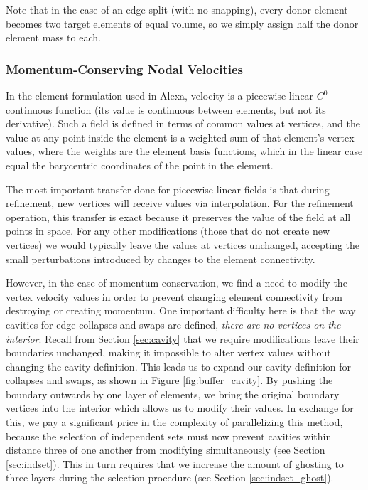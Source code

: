 Note that in the case of an edge split (with no snapping),
every donor element becomes two target elements of equal volume, so we simply
assign half the donor element mass to each.

\subsubsection{Momentum-Conserving Nodal Velocities}
\label{sec:conserve_momentum}

In the element formulation used in Alexa, velocity is
a piecewise linear $C^0$ continuous function
(its value is continuous between elements, but not its derivative).
Such a field is defined in terms of common values at vertices,
and the value at any point inside the element is a weighted sum
of that element's vertex values,
where the weights are the element basis functions, which
in the linear case equal the barycentric coordinates of the point
in the element.

The most important transfer done for piecewise linear fields is that during
refinement, new vertices will receive values via interpolation.
For the refinement operation, this transfer is exact because
it preserves the value of the field at all points in space.
For any other modifications (those that do not create
new vertices) we would typically leave the values at vertices unchanged,
accepting the small perturbations introduced by changes
to the element connectivity.

However, in the case of momentum conservation, we find a need
to modify the vertex velocity values in order to prevent
changing element connectivity from destroying or creating momentum.
One important difficulty here is that the way cavities for edge
collapses and swaps are defined, \emph{there are no vertices on
the interior}.
Recall from Section \ref{sec:cavity} that we require modifications
leave their boundaries unchanged, making it impossible to alter
vertex values without changing the cavity definition.
This leads us to expand our cavity definition for collapses
and swaps, as shown in Figure \ref{fig:buffer_cavity}.
By pushing the boundary outwards by one layer of elements,
we bring the original boundary vertices into the interior
which allows us to modify their values.
In exchange for this, we pay a significant price in the complexity
of parallelizing this method, because the selection of independent
sets must now prevent cavities within distance three of
one another from modifying simultaneously (see Section \ref{sec:indset}).
This in turn requires that we increase the amount of ghosting
to three layers during the selection procedure
(see Section \ref{sec:indset_ghost}).


